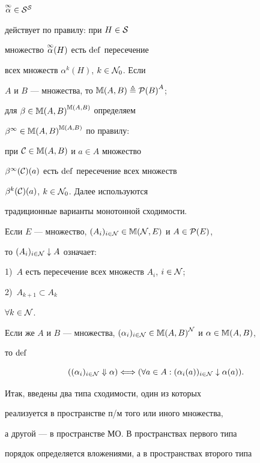 $\overset{\infty}{\alpha}{} \in {\cal S}^{\cal S}$


действует по правилу: при $H \in {\cal S}$


множество $\overset{\infty}{\alpha}{}(H)$ есть $\operatorname{def}$ пересечение


всех множеств ${{\alpha}^k}(H)$, $k \in {{\cal N}_0}$. Если


$A$ и $B$ --- множества, то ${\Bbb M}(A,B) \triangleq {{\cal P}(B)}^A$;


для $\beta \in {{\Bbb M}(A,B)}^{{\Bbb M}(A,B)}$ определяем


${{\beta}^\infty} \in {{\Bbb M}(A,B)}^{{\Bbb M}(A,B)}$ по правилу:


при ${\cal C} \in {\Bbb M}(A,B)$ и $a \in A$ множество


${{\beta}^\infty}({\cal


C})(a)$ есть $\Def$ пересечение всех множеств


${{\beta}^k}({\cal C})(a)$, $k \in {{\cal N}_0}$. Далее используются


традиционные варианты монотонной сходимости.


Если $E$ --- множество, $(A_i)_{i \in {\cal N}} \in {\Bbb M}({\cal N},


E)$ и $A \in {{\cal P}(E)}$,


то $(A_i)_{i \in {\cal N}} \downarrow A$ означает:


1)~$A$ есть пересечение всех множеств ${A_i}$, $i \in {\cal N}$;


2)~${A_{k+1}} \subset {A_k}$


$\forall{k} \in {\cal N}$.


Если же $A$ и $B$ --- множества, $({\alpha}_i)_{i \in {\cal N}} \in


{{\Bbb M}(A,B)}^{\cal N}$ и $\alpha \in {\Bbb M}(A,B)$,


то $\operatorname{def}$


$$


({({\alpha}_i)_{i \in {\cal N}}} \Downarrow \alpha) \Longleftrightarrow


(\fo{a} \in A:{({{\alpha}_i}(a))_{i \in {\cal N}}} \downarrow


{{\alpha}(a)}).


$$


Итак, введены два типа сходимости, один из которых


реализуется в пространстве п/м того или иного множества,


а другой --- в пространстве МО. В пространствах первого типа


порядок определяется вложениями, а в пространствах второго типа


